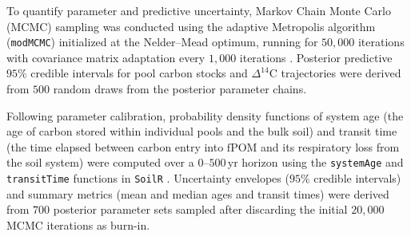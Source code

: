\documentclass[preprint,12pt]{elsarticle}
\begin{document}
To quantify parameter and predictive uncertainty, Markov Chain Monte Carlo (MCMC) sampling was conducted using the adaptive Metropolis algorithm (\texttt{modMCMC}) initialized at the Nelder--Mead optimum, running for $50{,}000$ iterations with covariance matrix adaptation every $1{,}000$ iterations \citep{Soetaert2010}. Posterior predictive $95\%$ credible intervals for pool carbon stocks and $\Delta^{14}\text{C}$ trajectories were derived from $500$ random draws from the posterior parameter chains.

Following parameter calibration, probability density functions of system age (the age of carbon stored within individual pools and the bulk soil) and transit time (the time elapsed between carbon entry into $\text{fPOM}$ and its respiratory loss from the soil system) were computed over a $0\text{--}500\,\text{yr}$ horizon using the \texttt{systemAge} and \texttt{transitTime} functions in \texttt{SoilR} \citep{Sierra2017, Sierra2018}. Uncertainty envelopes ($95\%$ credible intervals) and summary metrics (mean and median ages and transit times) were derived from $700$ posterior parameter sets sampled after discarding the initial $20{,}000$ MCMC iterations as burn-in.
\end{document}
